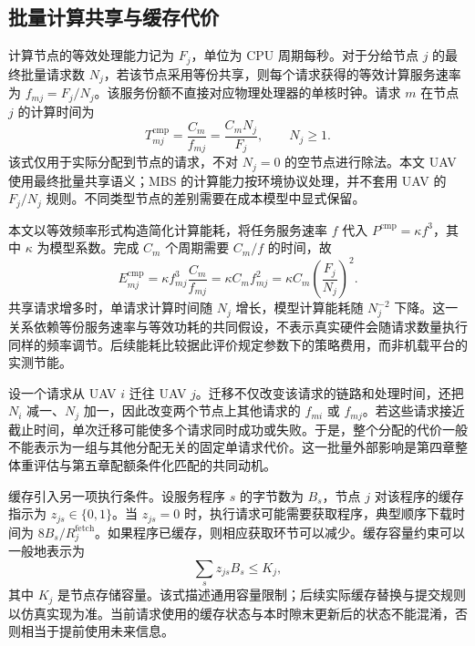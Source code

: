 \subsection{批量计算共享与缓存代价}
\label{subsec:offloading}

计算节点的等效处理能力记为 $F_j$，单位为 CPU 周期每秒。对于分给节点 $j$ 的最终批量请求数 $N_j$，若该节点采用等份共享，则每个请求获得的等效计算服务速率为 $f_{mj}=F_j/N_j$。该服务份额不直接对应物理处理器的单核时钟。请求 $m$ 在节点 $j$ 的计算时间为
\begin{equation}
    T^{\mathrm{cmp}}_{mj}=\frac{C_m}{f_{mj}}
    =\frac{C_m N_j}{F_j},\qquad N_j\geq 1.
    \label{eq:ch2-shared-computation}
\end{equation}
该式仅用于实际分配到节点的请求，不对 $N_j=0$ 的空节点进行除法。本文 UAV 使用最终批量共享语义；MBS 的计算能力按环境协议处理，并不套用 UAV 的 $F_j/N_j$ 规则。不同类型节点的差别需要在成本模型中显式保留。

本文以等效频率形式构造简化计算能耗，将任务服务速率 $f$ 代入 $P^{\mathrm{cmp}}=\kappa f^3$，其中 $\kappa$ 为模型系数。完成 $C_m$ 个周期需要 $C_m/f$ 的时间，故
\begin{equation}
    E^{\mathrm{cmp}}_{mj}
    =\kappa f_{mj}^{3}\frac{C_m}{f_{mj}}
    =\kappa C_m f_{mj}^{2}
    =\kappa C_m\left(\frac{F_j}{N_j}\right)^2.
    \label{eq:ch2-computation-energy}
\end{equation}
共享请求增多时，单请求计算时间随 $N_j$ 增长，模型计算能耗随 $N_j^{-2}$ 下降。这一关系依赖等份服务速率与等效功耗的共同假设，不表示真实硬件会随请求数量执行同样的频率调节。后续能耗比较据此评价规定参数下的策略费用，而非机载平台的实测节能。

设一个请求从 UAV $i$ 迁往 UAV $j$。迁移不仅改变该请求的链路和处理时间，还把 $N_i$ 减一、$N_j$ 加一，因此改变两个节点上其他请求的 $f_{mi}$ 或 $f_{mj}$。若这些请求接近截止时间，单次迁移可能使多个请求同时成功或失败。于是，整个分配的代价一般不能表示为一组与其他分配无关的固定单请求代价。这一批量外部影响是第四章整体重评估与第五章配额条件化匹配的共同动机。

缓存引入另一项执行条件。设服务程序 $s$ 的字节数为 $B_s$，节点 $j$ 对该程序的缓存指示为 $z_{js}\in\{0,1\}$。当 $z_{js}=0$ 时，执行请求可能需要获取程序，典型顺序下载时间为 $8B_s/R^{\mathrm{fetch}}_j$。如果程序已缓存，则相应获取环节可以减少。缓存容量约束可以一般地表示为
\begin{equation}
    \sum_s z_{js}B_s\leq K_j,
    \label{eq:ch2-cache-capacity}
\end{equation}
其中 $K_j$ 是节点存储容量。该式描述通用容量限制；后续实际缓存替换与提交规则以仿真实现为准。当前请求使用的缓存状态与本时隙末更新后的状态不能混淆，否则相当于提前使用未来信息。

